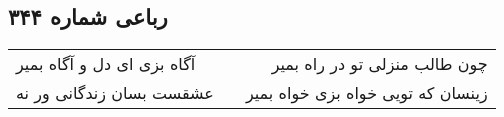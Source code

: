 \begin{center}
\section*{رباعی شماره ۳۴۴}
\label{sec:sh344}
\begin{longtable}{l p{0.5cm} r}
آگاه بزی ای دل و آگاه بمیر
&&
چون طالب منزلی تو در راه بمیر
\\
عشقست بسان زندگانی ور نه
&&
زینسان که تویی خواه بزی خواه بمیر
\\
\end{longtable}
\end{center}
